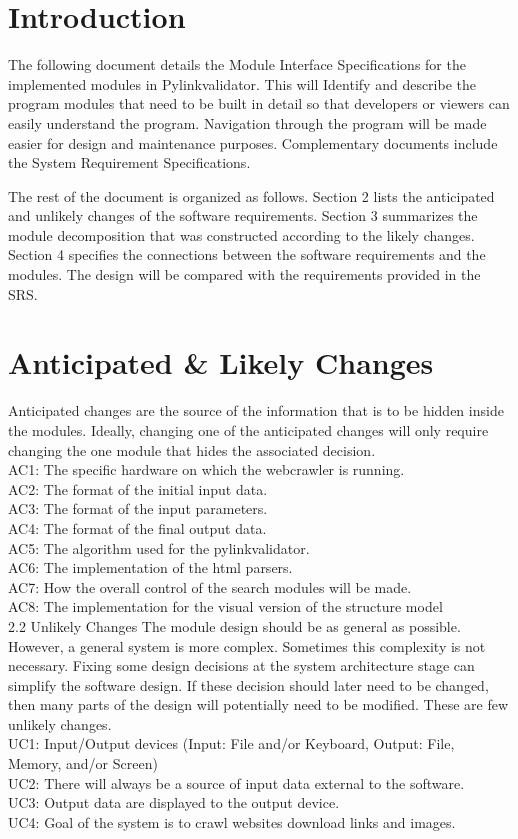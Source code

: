 \documentclass[titlepage]{article}
\begin{document}
\section{Introduction}
The following document details the Module Interface Specifications for the implemented modules in Pylinkvalidator. This will Identify and describe the program modules that need to be built in detail so that developers or viewers can easily understand the program.  Navigation through the program will be made easier for design and maintenance purposes. Complementary documents include the System Requirement Specifications.


The rest of the document is organized as follows. Section 2 lists the anticipated and unlikely changes of the software requirements. Section 3 summarizes the module decomposition that was constructed according to the likely changes. Section 4 specifies the connections between the software requirements and the modules. The design will be compared with the requirements provided in the SRS.


\section{Anticipated \& Likely Changes}
Anticipated changes are the source of the information that is to be hidden inside the modules. Ideally, changing one of the anticipated changes will only require changing the one module that hides the associated decision.\\
AC1: The specific hardware on which the webcrawler is running.\\
AC2: The format of the initial input data.\\
AC3: The format of the input parameters.\\
AC4: The format of the final output data.\\
AC5: The algorithm used for the pylinkvalidator.\\
AC6: The implementation of the html parsers.\\
AC7: How the overall control of the search modules will be made.\\
AC8: The implementation for the visual version of the structure model\\



2.2 Unlikely Changes
The module design should be as general as possible. However, a general system is more complex. Sometimes this complexity is not necessary. Fixing some design decisions at the system architecture stage can simplify the software design. If these decision should later need to be changed, then many parts of the design will potentially need to be modified.
These are few unlikely changes.\\
UC1: Input/Output devices (Input: File and/or Keyboard, Output: File, Memory, and/or
Screen)\\
UC2: There will always be a source of input data external to the software.\\
UC3: Output data are displayed to the output device.\\
UC4: Goal of the system is to crawl websites download links and images.\\
\end{document}
